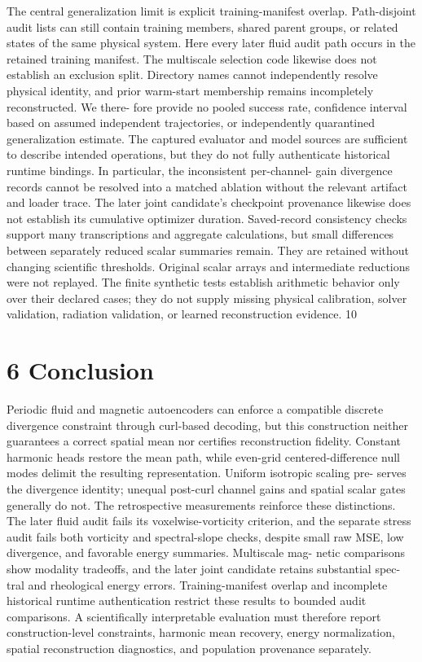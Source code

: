 \documentclass[11pt]{article}
\begin{document}
The central generalization limit is explicit training-manifest overlap. Path-disjoint audit lists can
still contain training members, shared parent groups, or related states of the same physical system.
Here every later fluid audit path occurs in the retained training manifest. The multiscale selection
code likewise does not establish an exclusion split. Directory names cannot independently resolve
physical identity, and prior warm-start membership remains incompletely reconstructed. We there-
fore provide no pooled success rate, confidence interval based on assumed independent trajectories,
or independently quarantined generalization estimate.
The captured evaluator and model sources are sufficient to describe intended operations, but they
do not fully authenticate historical runtime bindings. In particular, the inconsistent per-channel-
gain divergence records cannot be resolved into a matched ablation without the relevant artifact
and loader trace. The later joint candidate’s checkpoint provenance likewise does not establish its
cumulative optimizer duration.
Saved-record consistency checks support many transcriptions and aggregate calculations, but
small differences between separately reduced scalar summaries remain. They are retained without
changing scientific thresholds. Original scalar arrays and intermediate reductions were not replayed.
The finite synthetic tests establish arithmetic behavior only over their declared cases; they do not
supply missing physical calibration, solver validation, radiation validation, or learned reconstruction
evidence.
10


\section*{6 Conclusion}

Periodic fluid and magnetic autoencoders can enforce a compatible discrete divergence constraint
through curl-based decoding, but this construction neither guarantees a correct spatial mean nor
certifies reconstruction fidelity. Constant harmonic heads restore the mean path, while even-grid
centered-difference null modes delimit the resulting representation. Uniform isotropic scaling pre-
serves the divergence identity; unequal post-curl channel gains and spatial scalar gates generally
do not.
The retrospective measurements reinforce these distinctions. The later fluid audit fails its
voxelwise-vorticity criterion, and the separate stress audit fails both vorticity and spectral-slope
checks, despite small raw MSE, low divergence, and favorable energy summaries. Multiscale mag-
netic comparisons show modality tradeoffs, and the later joint candidate retains substantial spec-
tral and rheological energy errors. Training-manifest overlap and incomplete historical runtime
authentication restrict these results to bounded audit comparisons. A scientifically interpretable
evaluation must therefore report construction-level constraints, harmonic mean recovery, energy
normalization, spatial reconstruction diagnostics, and population provenance separately.
\end{document}
